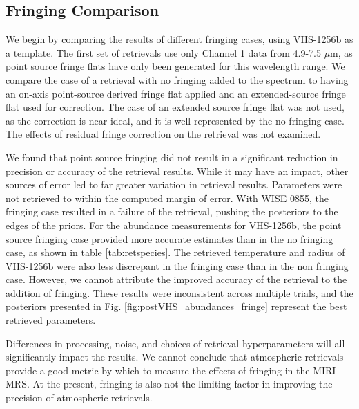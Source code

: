 \subsection{Fringing Comparison}
We begin by comparing the results of different fringing cases, using VHS-1256b as a template.
The first set of retrievals use only Channel 1 data from 4.9-7.5 $\mu$m, as point source fringe flats have only been generated for this wavelength range.
We compare the case of a retrieval with no fringing added to the spectrum to having an on-axis point-source derived fringe flat applied and an extended-source fringe flat used for correction.
The case of an extended source fringe flat was not used, as the correction is near ideal, and it is well represented by the no-fringing case.
The effects of residual fringe correction on the retrieval was not examined.

We found that point source fringing did not result in a significant reduction in precision or accuracy of the retrieval results.
While it may have an impact, other sources of error led to far greater variation in retrieval results.
Parameters were not retrieved to within the computed margin of error.
With WISE 0855, the fringing case resulted in a failure of the retrieval, pushing the posteriors to the edges of the priors.
For the abundance measurements for VHS-1256b, the point source fringing case provided more accurate estimates than in the no fringing case, as shown in table \ref{tab:retspecies}.
The retrieved temperature and radius of VHS-1256b were also less discrepant in the fringing case than in the non fringing case.
However, we cannot attribute the improved accuracy of the retrieval to the addition of fringing.
These results were inconsistent across multiple trials, and the posteriors presented in Fig. \ref{fig:postVHS_abundances_fringe} represent the best retrieved parameters. 

Differences in processing, noise, and choices of retrieval hyperparameters will all significantly impact the results.
We cannot conclude that atmospheric retrievals provide a good metric by which to measure the effects of fringing in the MIRI MRS.
At the present, fringing is also not the limiting factor in improving the precision of atmospheric retrievals.

